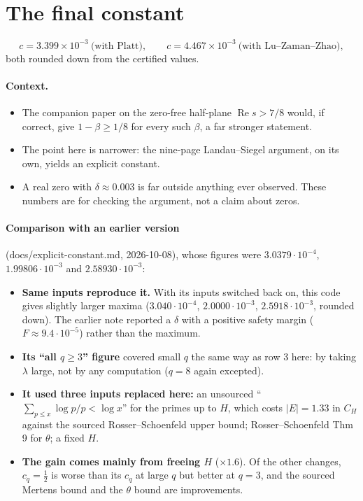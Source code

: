 \documentclass[11pt]{article}
\newcommand{\Rea}{\operatorname{Re}}
\begin{document}
\section{The final constant}

\[
c = 3.399\times10^{-3}\ \text{(with Platt)},\qquad c = 4.467\times10^{-3}\ \text{(with Lu--Zaman--Zhao)},
\]
both rounded down from the certified values.

\paragraph{Context.}
\begin{itemize}
\item The companion paper on the zero-free half-plane $\Rea s>7/8$ would, if correct, give $1-\beta\ge 1/8$ for every such $\beta$, a far stronger statement.
\item The point here is narrower: the nine-page Landau--Siegel argument, on its own, yields an explicit constant.
\item A real zero with $\delta\approx0.003$ is far outside anything ever observed. These numbers are for checking the argument, not a claim about zeros.
\end{itemize}

\paragraph{Comparison with an earlier version} (docs/explicit-constant.md, 2026-10-08), whose figures were $3.0379\cdot10^{-4}$, $1.99806\cdot10^{-3}$ and $2.58930\cdot10^{-3}$:
\begin{itemize}
\item \textbf{Same inputs reproduce it.} With its inputs switched back on, this code gives slightly larger maxima ($3.040\cdot10^{-4}$, $2.0000\cdot10^{-3}$, $2.5918\cdot10^{-3}$, rounded down). The earlier note reported a $\delta$ with a positive safety margin ($F\approx9.4\cdot10^{-5}$) rather than the maximum.
\item \textbf{Its ``all $q\ge3$'' figure} covered small $q$ the same way as row 3 here: by taking $\lambda$ large, not by any computation ($q=8$ again excepted).
\item \textbf{It used three inputs replaced here:} an unsourced ``$\sum_{p\le x}\log p/p<\log x$'' for the primes up to $H$, which costs $|E|=1.33$ in $C_H$ against the sourced Rosser--Schoenfeld upper bound; Rosser--Schoenfeld Thm 9 for $\theta$; a fixed $H$.
\item \textbf{The gain comes mainly from freeing $H$} ($\times1.6$). Of the other changes, $c_q=\frac12$ is worse than its $c_q$ at large $q$ but better at $q=3$, and the sourced Mertens bound and the $\theta$ bound are improvements.
\end{itemize}
\end{document}
